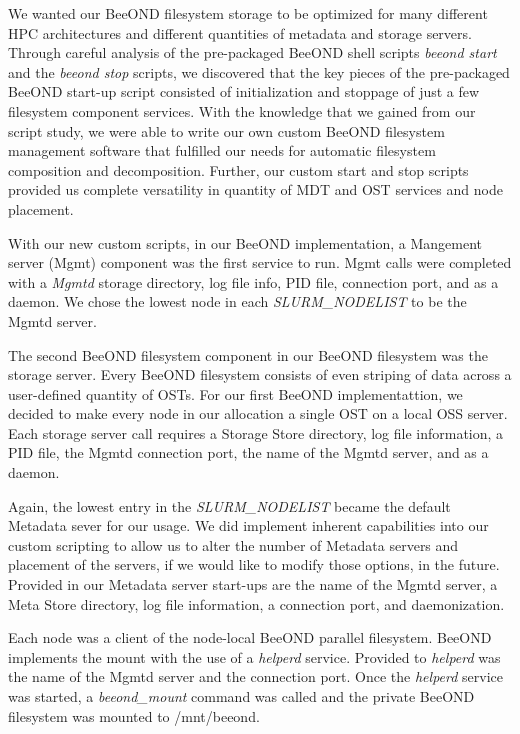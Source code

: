 We wanted our BeeOND filesystem storage to be optimized for many different HPC architectures and different quantities of metadata and storage servers.  Through careful analysis of the pre-packaged BeeOND shell scripts \textit{beeond start} and the \textit{beeond stop} scripts, we discovered that the key pieces of the pre-packaged BeeOND start-up script consisted of initialization and stoppage of just a few filesystem component services.  With the knowledge that we gained from our script study, we were able to write our own custom BeeOND filesystem management software that fulfilled our needs for automatic filesystem composition and decomposition.  Further, our custom start and stop scripts provided us complete versatility in quantity of MDT and OST services and node placement.  

With our new custom scripts, in our BeeOND implementation, a Mangement server (Mgmt) component was the first service to run.  Mgmt calls were completed with a \textit {Mgmtd} storage directory, log file info, PID file, connection port, and as a daemon.  We chose the lowest node in each \textit {SLURM\_NODELIST} to be the Mgmtd server.

The second BeeOND filesystem component in our BeeOND filesystem  was the storage server.  Every BeeOND filesystem consists of even striping of data across a user-defined quantity of OSTs.  For our first BeeOND implementattion, we decided to make every node in our allocation a single OST on a local OSS server.  Each storage server call requires a Storage Store directory, log file information, a PID file, the Mgmtd connection port, the name of the Mgmtd server, and as a daemon. 

Again, the lowest entry in the \textit{SLURM\_NODELIST} became the default Metadata sever for our usage.  We did implement inherent capabilities into our custom scripting to allow us to alter the number of Metadata servers and placement of the servers, if we would like to modify those options, in the future.  Provided in our Metadata server start-ups are the name of the Mgmtd server, a Meta Store directory, log file information, a connection port, and daemonization.

Each node was a client of the node-local BeeOND parallel filesystem.  BeeOND implements the mount with the use of a \textit{helperd} service.  Provided to \textit{helperd} was the name of the Mgmtd server and the connection port.  Once the \textit {helperd} service was started, a \textit{beeond\_mount} command was called and the private BeeOND filesystem was mounted to /mnt/beeond.  
 
